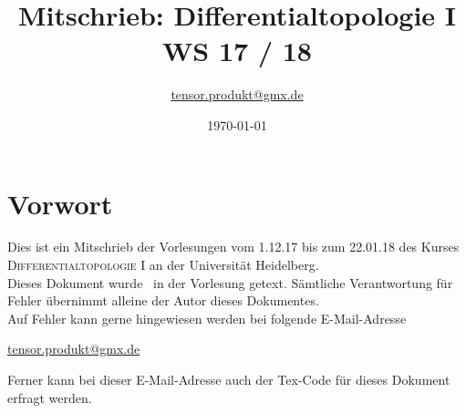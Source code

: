\documentclass[12pt]{book}
\date{\today}
\author{\href{mailto:tensor.produkt@gmx.de}{tensor.produkt@gmx.de}}
\begin{document}
\title{Mitschrieb: Differentialtopologie I\\
WS 17 / 18}
\maketitle
\section*{Vorwort}
Dies ist ein Mitschrieb der Vorlesungen vom 1.12.17 bis zum 22.01.18 des Kurses \textsc{Differentialtopologie I} an der Universität Heidelberg.\\
Dieses Dokument wurde \grqq\ in der Vorlesung getext. Sämtliche Verantwortung für Fehler übernimmt alleine der Autor dieses Dokumentes.\\
Auf Fehler kann gerne hingewiesen werden bei folgende E-Mail-Adresse
\begin{center}
	\href{mailto:tensor.produkt@gmx.de}{tensor.produkt@gmx.de}
\end{center}
Ferner kann bei dieser E-Mail-Adresse auch der Tex-Code für dieses Dokument erfragt werden.

\setcounter{tocdepth}{1}
\tableofcontents

















\printindex
\end{document}
